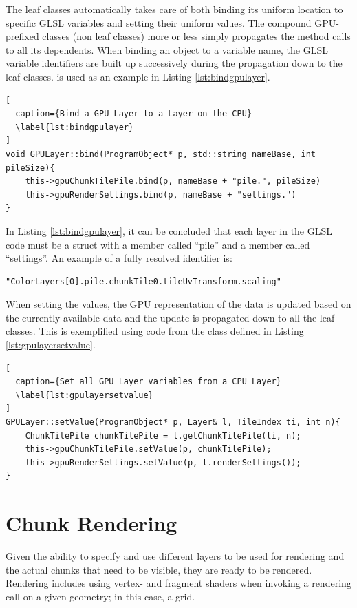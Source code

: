 The leaf classes automatically takes care of both binding its uniform location to specific GLSL variables and  setting their uniform values. The compound GPU-prefixed classes (non leaf classes) more or less simply propagates the method calls to all its dependents. When binding an object to a variable name, the GLSL variable identifiers are built up successively during the propagation down to the leaf classes.  is used as an example in Listing \ref{lst:bindgpulayer}.

\begin{lstlisting}[
  caption={Bind a GPU Layer to a Layer on the CPU} 
  \label{lst:bindgpulayer}
]
void GPULayer::bind(ProgramObject* p, std::string nameBase, int pileSize){
	this->gpuChunkTilePile.bind(p, nameBase + "pile.", pileSize)
	this->gpuRenderSettings.bind(p, nameBase + "settings.")
}
\end{lstlisting}

In Listing \ref{lst:bindgpulayer}, it can be concluded that each layer in the GLSL code must be a struct with a member called ``pile'' and a member called ``settings''. An example of a fully resolved identifier is: 

\begin{lstlisting}[]
"ColorLayers[0].pile.chunkTile0.tileUvTransform.scaling"
\end{lstlisting}

When setting the values, the GPU representation of the data is updated based on the currently available  data and the update is propagated down to all the leaf classes. This is exemplified using code from the  class defined in Listing \ref{lst:gpulayersetvalue}.

\begin{lstlisting}[
  caption={Set all GPU Layer variables from a CPU Layer} 
  \label{lst:gpulayersetvalue}
]
GPULayer::setValue(ProgramObject* p, Layer& l, TileIndex ti, int n){
	ChunkTilePile chunkTilePile = l.getChunkTilePile(ti, n);
	this->gpuChunkTilePile.setValue(p, chunkTilePile);
	this->gpuRenderSettings.setValue(p, l.renderSettings());
}
\end{lstlisting}

\section{Chunk Rendering}

Given the ability to specify and use different layers to be used for rendering and the actual chunks that need to be visible, they are ready to be rendered. Rendering includes using vertex- and fragment shaders when invoking a rendering call on a given geometry; in this case, a grid.

